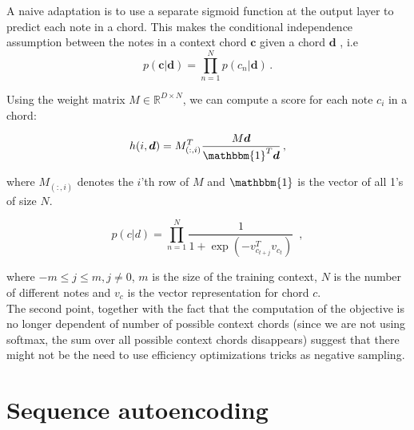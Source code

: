 \documentclass[12pt]{article}\pagestyle{myheadings}
\newcommand{\R}{\mathbb{R}}
\newcommand{\boldc}{\boldsymbol c}
\newcommand{\boldd}{\boldsymbol d}
\begin{document}
A naive adaptation is to use a separate sigmoid function at the output layer to predict each note in a chord. This makes the conditional independence assumption between the notes in a context chord $\boldc$ given a chord $\boldd$ , i.e \begin{equation}
p(\boldc | \boldd) = \prod_{n=1}^N  p(c_n |  \boldd) \,.
\end{equation} 

Using the weight matrix $M \in \R^{D \times N}$, we can compute a score for each note $c_i$ in a chord:

\begin{equation}
h(i,\boldd) = M_{(:,i)}^T \frac{M \boldd}{\mathbbm{1}^T \boldd} \,,
\end{equation}

where $M_{(:,i)}$ denotes the $i$'th row of $M$ and $\mathbbm{1}$ is the vector of all 1's of size $N$. 

\begin{equation}
p(c|d) = \prod_{n=1}^N \frac{1}{1 + \exp(-v_{c_{t+j}}^T v_{c_t})} \,\,\,,
\end{equation}

where $-m \leq j \leq m, j\neq 0$, $m$ is the size of the training context, $N$ is the number of different notes and  $v_c$ is the vector representation for chord $c$. \\

The second point, together with the fact that the computation of the objective is no longer dependent of number of possible context chords (since we are not using softmax, the sum over all possible context chords disappears) suggest that there might not be the need to use efficiency optimizations tricks as negative sampling. 
 
 
\section{Sequence autoencoding}
\end{document}
